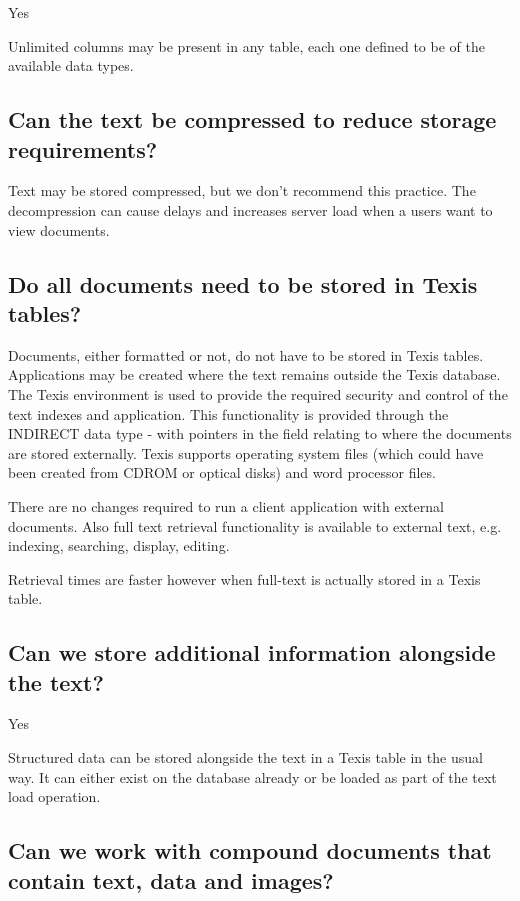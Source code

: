 Yes

Unlimited columns may be present in any table, each one defined to
be of the available data types.

\subsection{Can the text be compressed to reduce storage requirements?}

Text may be stored compressed, but we don't recommend this practice.
The decompression can cause delays and increases server load
when a users want to view documents.

\subsection{Do all documents need to be stored in Texis tables?}

Documents, either formatted or not, do not have to be stored in Texis
tables.  Applications may be created where the text remains outside the
Texis database.  The Texis environment is used to provide the required
security and control of the text indexes and application.  This
functionality is provided through the INDIRECT data type - with pointers
in the field relating to where the documents are stored externally.  Texis
supports operating system files (which could have been created from CDROM
or optical disks) and word processor files.

There are no changes required to run a client application with external
documents.  Also full text retrieval functionality is available
to external text, e.g. indexing, searching, display, editing.

Retrieval times are faster however when full-text is actually stored in
a Texis table.

\subsection{Can we store additional information alongside the text?}
Yes

Structured data can be stored alongside the text in a Texis table in the
usual way.  It can either exist on the database already or be loaded as
part of the text load operation.

\subsection{Can we work with compound documents that contain text, data and
 images?}

